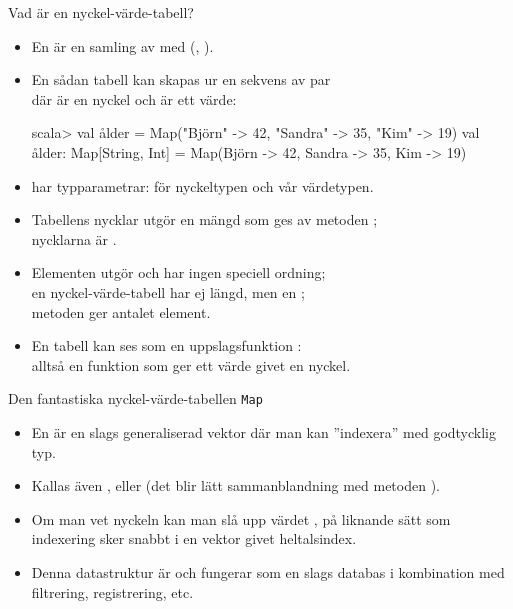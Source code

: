   






\begin{Slide}{Vad är en nyckel-värde-tabell?}\SlideFontSmall
\begin{itemize}
\item En  är en samling av  med 
(, ).
\item En sådan tabell kan skapas ur en sekvens av par \\
där  är en nyckel och  är ett värde:
\begin{REPL}
  scala> val ålder = Map("Björn" -> 42, "Sandra" -> 35, "Kim" -> 19)
  val ålder: Map[String, Int] = Map(Björn -> 42, Sandra -> 35, Kim -> 19)
\end{REPL}
\item {} har  typparametrar:  för nyckeltypen och  vår värdetypen.
\item Tabellens nycklar utgör en mängd som ges av metoden ;\\
nycklarna är .
\item Elementen utgör  och har ingen speciell ordning;
\\en nyckel-värde-tabell har ej längd, men en ;\\metoden {} ger antalet element.
\pause
\item En tabell kan ses som en uppslagsfunktion :\\alltså en funktion  som ger ett värde givet en nyckel.
\end{itemize}
\end{Slide}


\begin{Slide}{Den fantastiska nyckel-värde-tabellen \texttt{Map}}\SlideFontSmall
\begin{itemize}
\item En   är en slags generaliserad vektor där man kan ''indexera'' med godtycklig typ.

\item Kallas även \href{https://sv.wikipedia.org/wiki/Hashtabell}{} ,   eller   (det blir lätt sammanblandning med metoden ).

\item Om man vet nyckeln kan man slå upp värdet , på liknande sätt som indexering sker snabbt i en vektor givet heltalsindex.

\item Denna datastruktur är  och fungerar som en slags databas i kombination med filtrering, registrering, etc.
\end{itemize}
\end{Slide}


